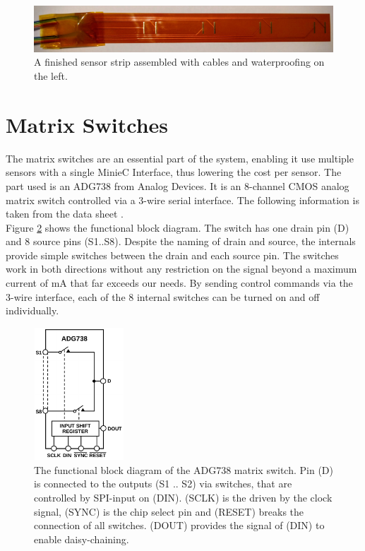 \begin{figure}
	\begin{center}
		\includegraphics[width=\textwidth]{images/fpcbp.jpg} 
		\caption{A finished sensor strip assembled with cables and waterproofing on the left.}
		\label{fig:fpcbp}
	\end{center}
\end{figure}

\section{Matrix Switches}

The matrix switches are an essential part of the system, enabling it use multiple sensors with a single MinieC Interface, thus lowering the cost per sensor. The part used is an ADG738 from Analog Devices. It is an 8-channel CMOS analog matrix switch controlled via a 3-wire serial interface. The following information is taken from the data sheet \cite{ms}.\\

Figure \ref{fig:ms} shows the functional block diagram. The switch has one drain pin (D) and 8 source pins (S1..S8). Despite the naming of drain and source, the internals provide simple switches between the drain and each source pin. The switches work in both directions without any restriction on the signal beyond a maximum current of \unit[120]{mA} that far exceeds our needs. By sending control commands via the 3-wire interface, each of the 8 internal switches can be turned on and off individually.\\

\begin{figure}
	\begin{center}
		\includegraphics[width=0.3\textwidth]{images/ms.pdf} 
		\caption{The functional block diagram of the ADG738 matrix switch. Pin (D) is connected to the outputs (S1 .. S2) via switches, that are controlled by SPI-input on (DIN). (SCLK) is the driven by the clock signal, (SYNC) is the chip select pin and (RESET) breaks the connection of all switches. (DOUT) provides the signal of (DIN) to enable daisy-chaining.}
		\label{fig:ms}
	\end{center}
\end{figure}

